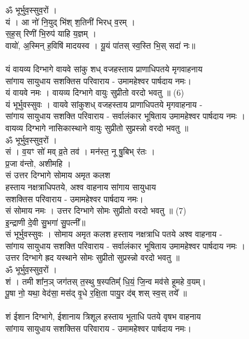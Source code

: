 ॐ भूर्भुव॒स्सुव॒रों ।\\
यं । आ नो॑ नि॒युद् भि॑श् श॒तिनी॑ भिरध् व॒रम् । \\
स॒ह॒स् रिणी॑ भि॒रुप॑ याहि य॒ज्ञम् ।\\
वायो॑, अ॒स्मिन् ह॒विषि॑ मादयस्व । यू॒यं पा॑तस् स्व॒स्ति भि॒स् सदा॑ नः॥\\
\\
यं वायव्य दिग्भागे वायवे सांकु शध् वजहस्ताय प्राणाधिपतये मृगवाहनाय\\
सांगाय सायुधाय सशक्तिस परिवाराय -  उमामहेश्वर पार्षदाय नमः।\\
यं वायवे नमः । वायव्य दिग्भागे  वायुः सुप्रीतो  वरदो भवतु ॥ (6)\\
{\small यं भूर्भुवस्सुवः । वायवे सांकुशध् वजहस्ताय प्राणाधिपतये मृगवाहनाय -\\
सांगाय सायुधाय सशक्ति परिवाराय - सर्वालंकार भूषिताय उमामहेश्वर पार्षदाय नमः ।\\
वायव्य दिग्भागे नासिकास्थाने वायुः सुप्रीतो सुप्रस्न्नो वरदो भवतु ॥}\\
ॐ भूर्भुव॒स्सुव॒रों ।\\
सं । व॒यꣳ सो॑ मव् व्र॒ते तव॑ । मन॑स्त॒ नू षु॒बिभ् र॑तः ।\\
प्र॒जा व॑न्तो, अशीमहि ।\\
सं उत्तर दिग्भागे सोमाय अमृत कलश \\
हस्ताय नक्षत्राधिपतये, अश्व वाहनाय सांगाय सायुधाय \\
सशक्तिस परिवाराय - उमामहेश्वर पार्षदाय नमः।\\
सं सोमाय नमः । उत्तर दिग्भागे  सोमः सुप्रीतो वरदो भवतु ॥ (7)\\
{\small इ॒न्द्राणी दे॒वी सु॒भगा॑ सु॒पत्नी᳚॥\\
सं भूर्भुवस्सुवः । सोमाय अमृत कलश हस्ताय नक्षत्राधि पतये अश्व वाहनाय -\\
सांगाय सायुधाय सशक्ति परिवाराय - सर्वालंकार भूषिताय उमामहेश्वर पार्षदाय नमः ।\\
उत्तर दिग्भागे ह्रद यस्थाने सोमः सुप्रीतो सुप्रस्न्नो वरदो भवतु ॥}\\
ॐ भूर्भुव॒स्सुव॒रों ।\\
शं । तमी शा᳚न॒ञ् जग॑तस् त॒स्थु ष॒स्पतिम्᳚ धि॒यं॒ जि॒न्व मव॑से हूमहे व॒यम्।\\
पू॒षा नो॒ यथा॒ वेद॑सा॒ मस॑द् वृ॒धे र॒क्षि॒ता पायु॒र द॑ब् शस् स्व॒स् तये᳚ ॥\\
\\
शं ईशान दिग्भागे, ईशानाय त्रिशूल हस्ताय भूताधि पतये वृषभ वाहनाय\\
सांगाय सायुधाय सशक्तिस परिवाराय -  उमामहेश्वर पार्षदाय नमः।\\
